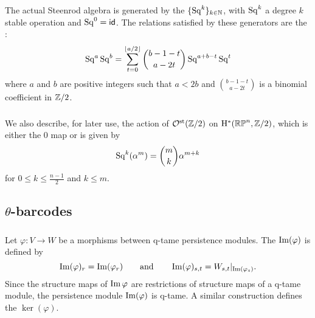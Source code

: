 \subsubsection{} The actual Steenrod algebra is generated by the  $\{\operatorname{Sq}^k\}_{k \in \mathbb{N}}$, with $\operatorname{Sq}^k$ a degree $k$ stable operation and $\operatorname{Sq}^0 = \mathsf{id}$.
The relations satisfied by these generators are the :
\[
\operatorname{Sq}^a \operatorname{Sq}^b = \sum_{t = 0}^{\lfloor a/2 \rfloor} \binom{b-1-t}{a-2t} \operatorname{Sq}^{a+b-t} \operatorname{Sq}^t
\]
where $a$ and $b$ are positive integers such that $a < 2b$ and \(\binom{b-1-t}{a-2t}\) is a binomial coefficient in $\mathbb{Z}/2$.

\subsubsection{} We also describe, for later use, the action of $\mathcal{O}^{\mathrm{st}}(\mathbb{Z}/2)$ on $\mathrm{H}^*(\mathbb{RP}^n, \mathbb{Z}/2)$, which is either the 0 map or is given by
\[
\operatorname{Sq}^k(\alpha^m) = \binom{m}{k}\alpha^{m+k}
\]
for $0 \leq k \leq \frac{n-1}{2}$ and $k \leq m$.


\subsection{$\theta$-barcodes}

\subsubsection{} Let $\varphi \colon V \to W$ be a morphisms between q-tame persistence modules.
The  $\operatorname{Im}(\varphi)$ is defined by
\[
\operatorname{Im}(\varphi)_r = \operatorname{Im}(\varphi_r)
\qquad\text{and}\qquad
\operatorname{Im}(\varphi)_{s,t} = W_{s,t}|_{\operatorname{Im}(\varphi_s)}.
\]
Since the structure maps of $\operatorname{Im} \varphi$ are restrictions of structure maps of a q-tame module, the persistence module $\operatorname{Im}(\varphi)$ is q-tame.
A similar construction defines the  $\ker(\varphi)$.

